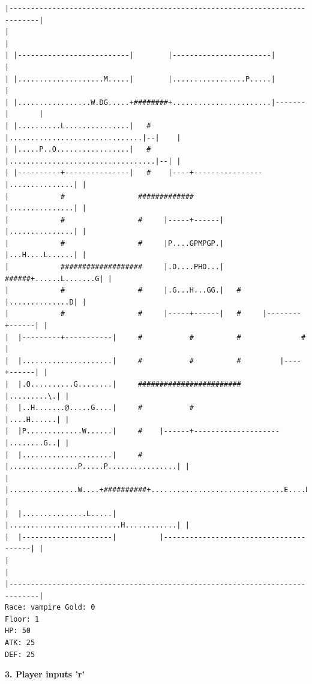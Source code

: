 \documentclass[11pt]{article}
\theoremstyle{plain}
\begin{document}
\begin{Verbatim}[fontsize=\scriptsize]
|-----------------------------------------------------------------------------|
|                                                                             |
| |--------------------------|        |-----------------------|               |
| |....................M.....|        |.................P.....|               |
| |.................W.DG.....+########+.......................|-------|       |
| |..........L...............|   #    |...............................|--|    |
| |.....P..O.................|   #    |..................................|--| |
| |----------+---------------|   #    |----+----------------|...............| |
|            #                 #############                |...............| |
|            #                 #     |-----+------|         |...............| |
|            #                 #     |P....GPMPGP.|         |...H....L......| |
|            ###################     |.D....PHO...|   ######+......L.......G| |
|            #                 #     |.G...H...GG.|   #     |..............D| |
|            #                 #     |-----+------|   #     |--------+------| |
|  |---------+-----------|     #           #          #              #        |
|  |.....................|     #           #          #         |----+------| |
|  |.O..........G........|     ########################         |.........\.| |
|  |..H.......@.....G....|     #           #                    |....H......| |
|  |P.............W......|     #    |------+--------------------|........G..| |
|  |.....................|     #    |................P.....P................| |
|  |................W....+##########+...............................E....L..| |
|  |...............L.....|          |..........................H............| |
|  |---------------------|          |---------------------------------------| |
|                                                                             |
|-----------------------------------------------------------------------------|
Race: vampire Gold: 0                                                  Floor: 1
HP: 50
ATK: 25
DEF: 25
\end{Verbatim}



\newpage
\textbf{3. Player inputs 'r'}
\end{document}
